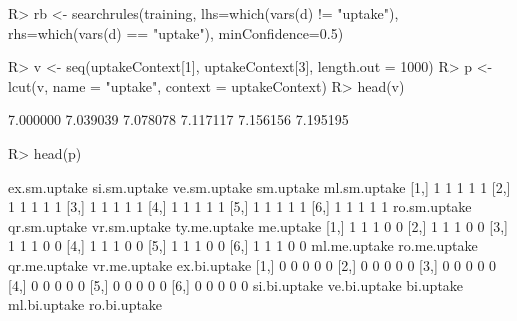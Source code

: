 \documentclass{article}\usepackage[]{graphicx}\usepackage[]{color}
\begin{document}
\begin{Schunk}
% --begin: "pbld4"
\begin{Sinput}
R> rb <- searchrules(training,
                     lhs=which(vars(d) != "uptake"),
                     rhs=which(vars(d) == "uptake"),
                     minConfidence=0.5)
\end{Sinput}
%
% --end: "pbld4"
\end{Schunk}

\begin{Schunk}
% --begin: "pbld5"
\begin{Sinput}
R> v <- seq(uptakeContext[1], uptakeContext[3], length.out = 1000)
R> p <- lcut(v, name = "uptake", context = uptakeContext)
R> head(v)
\end{Sinput}
\begin{Soutput}
[1] 7.000000 7.039039 7.078078 7.117117 7.156156 7.195195
\end{Soutput}
\begin{Sinput}
R> head(p)
\end{Sinput}
\begin{Soutput}
     ex.sm.uptake si.sm.uptake ve.sm.uptake sm.uptake ml.sm.uptake
[1,]            1            1            1         1            1
[2,]            1            1            1         1            1
[3,]            1            1            1         1            1
[4,]            1            1            1         1            1
[5,]            1            1            1         1            1
[6,]            1            1            1         1            1
     ro.sm.uptake qr.sm.uptake vr.sm.uptake ty.me.uptake me.uptake
[1,]            1            1            1            0         0
[2,]            1            1            1            0         0
[3,]            1            1            1            0         0
[4,]            1            1            1            0         0
[5,]            1            1            1            0         0
[6,]            1            1            1            0         0
     ml.me.uptake ro.me.uptake qr.me.uptake vr.me.uptake ex.bi.uptake
[1,]            0            0            0            0            0
[2,]            0            0            0            0            0
[3,]            0            0            0            0            0
[4,]            0            0            0            0            0
[5,]            0            0            0            0            0
[6,]            0            0            0            0            0
     si.bi.uptake ve.bi.uptake bi.uptake ml.bi.uptake ro.bi.uptake

\end{Soutput}
\end{Schunk}
\end{document}
